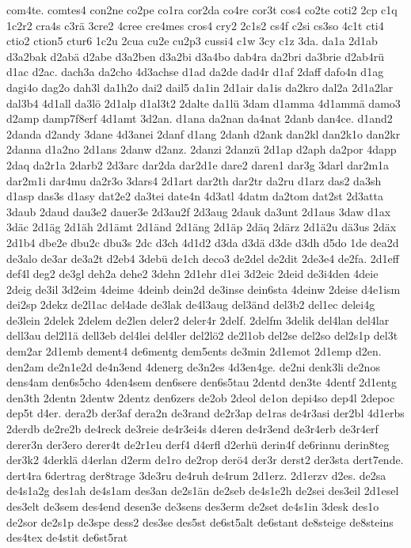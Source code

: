 {com4te.
comtes4
con2ne
co2pe
co1ra
cor2da
co4re
cor3t
cos4
co2te
coti2
2cp
c1q
1c2r2
cra4s
c3rä
3cre2
4cree
cre4mes
cros4
cry2
2c1s2
cs4f
c2si
cs3so
4c1t
cti4
ctio2
ction5
ctur6
1c2u
2cua
cu2e
cu2p3
cussi4
c1w
3cy
c1z
3da.
da1a
2d1ab
d3a2bak
d2abä
d2abe
d3a2ben
d3a2bi
d3a4bo
dab4ra
da2bri
da3brie
d2ab4rü
d1ac
d2ac.
dach3a
da2cho
4d3achse
d1ad
da2de
dad4r
d1af
2daff
dafo4n
d1ag
dagi4o
dag2o
dah3l
da1h2o
dai2
dail5
da1in
2d1air
da1is
da2kro
dal2a
2d1a2lar
dal3b4
4d1all
da3lö
2d1alp
d1al3t2
2dalte
da1lü
3dam
d1amma
4d1ammä
damo3
d2amp
damp7f8erf
4d1amt
3d2an.
d1ana
da2nan
da4nat
2danb
dan4ce.
d1and2
2danda
d2andy
3dane
4d3anei
2danf
d1ang
2danh
d2ank
dan2kl
dan2k1o
dan2kr
2danna
d1a2no
2d1ans
2danw
d2anz.
2danzi
2danzü
2d1ap
d2aph
da2por
4dapp
2daq
da2r1a
2darb2
2d3arc
dar2da
dar2d1e
dare2
daren1
dar3g
3darl
dar2m1a
dar2m1i
dar4mu
da2r3o
3dars4
2d1art
dar2th
dar2tr
da2ru
d1arz
das2
da3sh
d1asp
das3s
d1asy
dat2e2
da3tei
date4n
4d3atl
4datm
da2tom
dat2st
2d3atta
3daub
2daud
dau3e2
dauer3e
2d3au2f
2d3aug
2dauk
da3unt
2d1aus
3daw
d1ax
3däc
2d1äg
2d1äh
2d1ämt
2d1änd
2d1äng
2d1äp
2däq
2därz
2d1ä2u
dä3us
2däx
2d1b4
dbe2e
dbu2c
dbu3s
2dc
d3ch
4d1d2
d3da
d3dä
d3de
d3dh
d5do
1de
dea2d
de3alo
de3ar
de3a2t
d2eb4
3debü
de1ch
deco3
de2del
de2dit
2de3e4
de2fa.
2d1eff
def4l
deg2
de3gl
deh2a
dehe2
3dehn
2d1ehr
d1ei
3d2eic
2deid
de3i4den
4deie
2deig
de3il
3d2eim
4deime
4deinb
dein2d
de3inse
dein6sta
4deinw
2deise
d4e1ism
dei2sp
2dekz
de2l1ac
del4ade
de3lak
de4l3aug
del3änd
del3b2
del1ec
delei4g
de3lein
2delek
2delem
de2len
deler2
deler4r
2delf.
2delfm
3delik
del4lan
del4lar
dell3au
del2l1ä
dell3eb
del4lei
del4ler
del2lö2
de2l1ob
del2se
del2so
del2s1p
del3t
dem2ar
2d1emb
dement4
de6mentg
dem5ents
de3min
2d1emot
2d1emp
d2en.
den2am
de2n1e2d
de4n3end
4denerg
de3n2es
4d3en4ge.
de2ni
denk3li
de2nos
dens4am
den6s5cho
4den4sem
den6sere
den6s5tau
2dentd
den3te
4dentf
2d1entg
den3th
2dentn
2dentw
2dentz
den6zers
de2ob
2deol
de1on
depi4so
dep4l
2depoc
dep5t
d4er.
dera2b
der3af
dera2n
de3rand
de2r3ap
de1ras
de4r3asi
der2bl
4d1erbs
2derdb
de2re2b
de4reck
de3reie
de4r3ei4s
d4eren
de4r3end
de3r4erb
de3r4erf
derer3n
der3ero
derer4t
de2r1eu
derf4
d4erfl
d2erhü
derin4f
de6rinnu
derin8teg
der3k2
4derklä
d4erlan
d2erm
de1ro
de2rop
derö4
der3r
derst2
der3sta
dert7ende.
dert4ra
6dertrag
der8trage
3de3ru
de4ruh
de4rum
2d1erz.
2d1erzv
d2es.
de2sa
de4s1a2g
des1ah
de4s1am
des3an
de2s1än
de2seb
de4s1e2h
de2sei
des3eil
2d1esel
des3elt
de3sem
des4end
desen3e
de3sens
des3erm
de2set
de4s1in
3desk
des1o
de2sor
de2s1p
de3spe
dess2
des3se
des5st
de6st5alt
de6stant
de8steige
de8steins
des4tex
de4stit
de6st5rat
}
